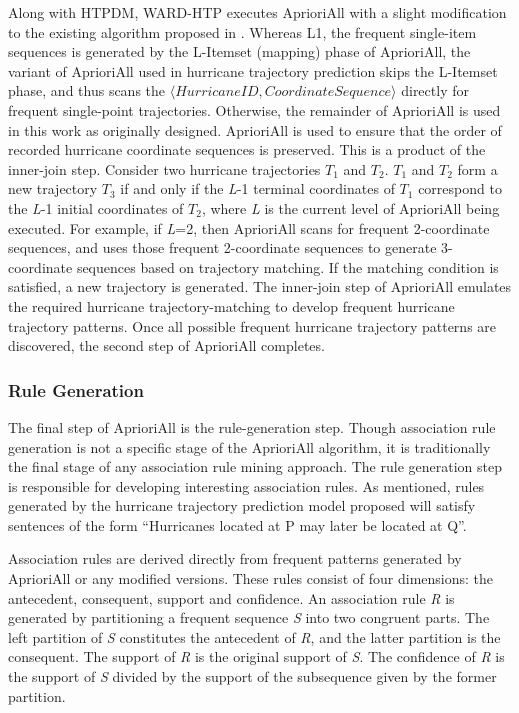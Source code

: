 \documentclass[12pt,conference]{IEEEtran}
\begin{document}
Along with HTPDM, WARD-HTP executes AprioriAll with a slight modification to the existing algorithm proposed in \cite{AprioriAll-original}. Whereas L1, the frequent single-item sequences is generated by the L-Itemset (mapping) phase of AprioriAll, the variant of AprioriAll used in hurricane trajectory prediction skips the L-Itemset phase, and thus scans the $\langle HurricaneID, CoordinateSequence\rangle$ directly for frequent single-point trajectories. Otherwise, the remainder of AprioriAll is used in this work as originally designed. AprioriAll is used to ensure that the order of recorded hurricane coordinate sequences is preserved. This is a product of the inner-join step. Consider two hurricane trajectories $T_{1}$ and $T_{2}$. $T_{1}$ and $T_{2}$ form a new trajectory $T_{3}$ if and only if the \textit{L}-1 terminal coordinates of $T_{1}$ correspond to the \textit{L}-1 initial coordinates of $T_{2}$, where \textit{L} is the current level of AprioriAll being executed. For example, if \textit{L}=2, then AprioriAll scans for frequent 2-coordinate sequences, and uses those frequent 2-coordinate sequences to generate 3-coordinate sequences based on trajectory matching. If the matching condition is satisfied, a new trajectory is generated. The inner-join step of AprioriAll emulates the required hurricane trajectory-matching to develop frequent hurricane trajectory patterns. Once all possible frequent hurricane trajectory patterns are discovered, the second step of AprioriAll completes.

\subsubsection{Rule Generation}

The final step of AprioriAll is the rule-generation step. Though association rule generation is not a specific stage of the AprioriAll algorithm, it is traditionally the final stage of any association rule mining approach. The rule generation step is responsible for developing interesting association rules. As mentioned, rules generated by the hurricane trajectory prediction model proposed will satisfy sentences of the form ``Hurricanes located at P may later be located at Q''. 

Association rules are derived directly from frequent patterns generated by AprioriAll or any modified versions. These rules consist of four dimensions: the antecedent, consequent, support and confidence. An association rule \textit{R} is generated by partitioning a frequent sequence \textit{S} into two congruent parts. The left partition of \textit{S} constitutes the antecedent of \textit{R}, and the latter partition is the consequent. The support of \textit{R} is the original support of \textit{S}. The confidence of \textit{R} is the support of \textit{S} divided by the support of the subsequence given by the former partition. 
\end{document}
